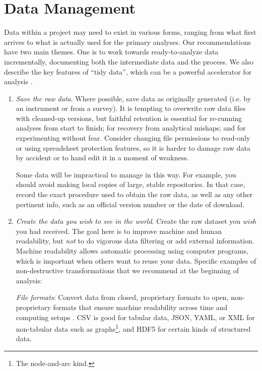 \documentclass[10pt]{article}
\newcommand{\recommend}[1]{\textit{#1}}
\begin{document}
\section{Data Management}\label{sec:data}

Data within a project may need to exist in various forms, ranging from what
first arrives to what is actually used for the primary analyses.  Our recommendations have
two main themes. One is to work towards ready-to-analyze data incrementally,
documenting both the intermediate data and the process. We also describe the
key features of ``tidy data'', which can be a powerful accelerator for analysis
\cite{wickham2014,hart2015}.

\begin{enumerate}

\item
  \recommend{Save the raw data}.  Where possible,
  save data as originally generated (i.e. by an instrument or from a survey).
  It is
  tempting to overwrite raw data files with cleaned-up versions, but
  faithful retention is essential for re-running analyses
  from start to finish; for recovery from analytical
  mishaps; and for experimenting without fear. Consider changing file permissions to
  read-only or using spreadsheet protection features,
  so it is harder to damage raw
  data by accident or to hand edit it in a moment of weakness.

  Some data will be impractical to manage in this way. For example, you should avoid
  making local copies of large, stable repositories.
  In that case, record the exact procedure used to obtain the raw data, as well
  as any other pertinent info, such as an official version number or the date of download.

\item
  \recommend{Create the data you wish to see in the world}. Create the raw dataset you
  \emph{wish} you had received.  The goal here is to improve machine and human
  readability, but \emph{not} to do vigorous data filtering or add external information.
  Machine readability allows automatic processing using computer programs, 
  which is important when others want to reuse your data.
  Specific examples of non-destructive transformations that we recommend at the beginning
  of analysis:

  \emph{File formats}: Convert data from closed, proprietary formats to open,
  non-proprietary formats that ensure machine readability across time and computing
  setups \cite{ffIllinois}. CSV is good for tabular data, JSON, YAML, or XML for
  non-tabular data such as graphs\footnote{The node-and-arc kind.}, and HDF5 for certain
  kinds of structured data.


\end{enumerate}
\end{document}
